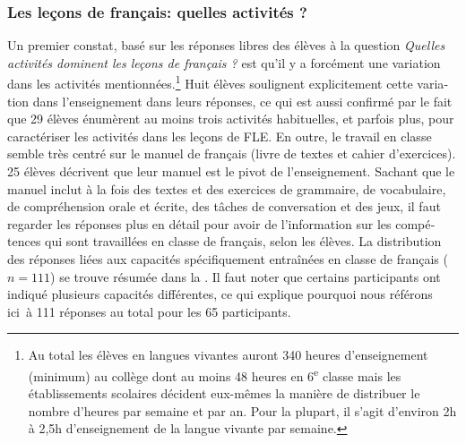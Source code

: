 \documentclass[french, output=paper]{langscibook}
\begin{document}
\begin{otherlanguage}{french}
\subsubsection{Les leçons de français: quelles activités ?}

Un premier constat, basé sur les réponses libres des élèves à la question \textit{Quelles activités dominent les leçons de français ?} est qu’il y a forcément une variation dans les activités mentionnées.\footnote{{Au total les élèves en langues vivantes auront 340 heures d’enseignement (minimum) au collège dont au moins 48 heures en 6\textsuperscript{e} classe mais les établissements scolaires décident eux-mêmes la manière de distribuer le nombre d’heures par semaine et par an. Pour la plupart, il s’agit d’environ 2h à 2,5h d’enseignement de la langue vivante par semaine.}} Huit élèves soulignent explicitement cette variation dans l’enseignement dans leurs réponses, ce qui est aussi confirmé par le fait que 29 élèves énumèrent au moins trois activités habituelles, et parfois plus, pour caractériser les activités dans les leçons de FLE. En outre, le travail en classe semble très centré sur le manuel de français (livre de textes et cahier d’exercices). 25 élèves décrivent que leur manuel est le pivot de l’enseignement. Sachant que le manuel inclut à la fois des textes et des exercices de grammaire, de vocabulaire, de compréhension orale et écrite, des tâches de conversation et des jeux, il faut regarder les réponses plus en détail pour avoir de l’information sur les compétences qui sont travaillées en classe de français, selon les élèves. La distribution des réponses liées aux capacités spécifiquement entraînées en classe de français ($n=111$) se trouve résumée dans la . Il faut noter que certains participants ont indiqué plusieurs capacités différentes, ce qui explique pourquoi nous référons ici~à 111 réponses au total pour les 65 participants.

  
\begin{figure}
 


\end{figure}
\end{otherlanguage}
\end{document}
